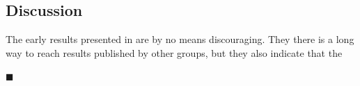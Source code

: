 \begin{refsection}
\section{Discussion}\label{sec:corrective_optics_discussion}

The early results presented in are by no means discouraging. They there is a long way to reach results published by other groups, but they also indicate that the

$\blacksquare$

\clearpage
{}
\printbibliography[heading=subbibliography]
\end{refsection}
